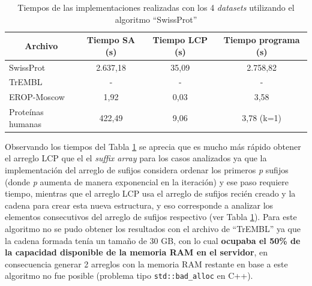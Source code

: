 \begin{table}[h]
\centering
\begin{tabular}{|l|c|c|c|}
\hline
\multicolumn{1}{|c|}{\textbf{Archivo}}  & \textbf{Tiempo SA (s)} & \textbf{Tiempo LCP (s)} & \textbf{Tiempo programa (s)} \\ \hline
SwissProt         & 2.637,18                & 35,09                   & 2.758,82                         \\
TrEMBL            & -                & -                &        -                  \\
EROP-Moscow       & 1,92                   & 0,03                    & 3,58                         \\
Proteínas humanas & 422,49                 & 9,06                    & 3,78 (k=1)                         \\ \hline
\end{tabular}
\caption{Tiempos de las implementaciones realizadas con los 4 \textit{datasets} utilizando el algoritmo ``SwissProt''}
\label{tb:labelr3}
\end{table}

Observando los tiempos del Tabla \ref{tb:labelr3} se aprecia que es mucho más rápido obtener el arreglo LCP que el el \textit{suffix array} para los casos analizados ya que la implementación del arreglo de sufijos considera ordenar los primeros \textit{p} sufijos (donde \textit{p} aumenta de manera exponencial en la iteración) y ese paso requiere tiempo, mientras que el arreglo LCP usa el arreglo de sufijos recién creado y la cadena para crear esta nueva estructura, y eso corresponde a analizar los elementos consecutivos del arreglo de sufijos respectivo (ver Tabla \ref{tb:labelr3}). Para este algoritmo no se pudo obtener los resultados con el archivo de ``TrEMBL'' ya que la cadena formada tenía un tamaño de 30 GB, con lo cual \textbf{ocupaba el 50\% de la capacidad disponible de la memoria RAM en el servidor}, en consecuencia generar 2 arreglos con la memoria RAM restante en base a este algoritmo no fue posible (problema tipo \texttt{std::bad\_alloc} en C++). 

